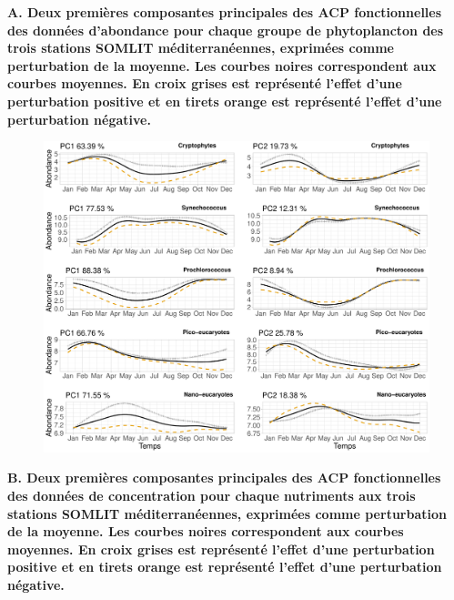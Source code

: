 \documentclass[12pt]{article}
\begin{document}
\newpage
\begin{appendices}

{\bfseries A. Deux premières composantes principales des ACP fonctionnelles des données d'abondance pour chaque groupe de phytoplancton des trois stations SOMLIT méditerranéennes, exprimées comme perturbation de la moyenne. Les courbes noires correspondent aux courbes moyennes. En croix grises est représenté l’effet d’une perturbation positive et en tirets orange est représenté l’effet d’une perturbation négative. }

\begin{figure}
\centering
\includegraphics[width=\textwidth, height=.75\textheight]{fig/ANNEXE_fpca_ab.pdf}
\end{figure}

\newpage

{\bfseries B. Deux premières composantes principales des ACP fonctionnelles des données de concentration pour chaque nutriments aux trois stations SOMLIT méditerranéennes, exprimées comme perturbation de la moyenne. Les courbes noires correspondent aux courbes moyennes. En croix grises est représenté l’effet d’une perturbation positive et en tirets orange est représenté l’effet d’une perturbation négative. }


\end{appendices}
\end{document}
